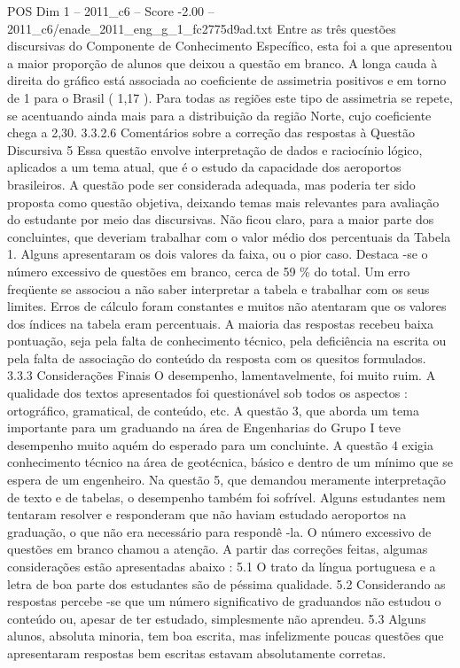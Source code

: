 \begin{textsample}{POS Dim 1 – 2011\_c6 – Score -2.00 – 2011\_c6/enade\_2011\_eng\_g\_1\_fc2775d9ad.txt}
Entre as três questões discursivas do Componente de Conhecimento Específico, esta foi a que apresentou a maior proporção de alunos que deixou a questão em branco.
A longa cauda à direita do gráfico está associada ao coeficiente de assimetria positivos e em torno de 1 para o Brasil ( 1,17 ).
Para todas as regiões este tipo de assimetria se repete, se acentuando ainda mais para a distribuição da região Norte, cujo coeficiente chega a 2,30. 3.3.2.6 Comentários sobre a correção das respostas à Questão Discursiva 5 Essa questão envolve interpretação de dados e raciocínio lógico, aplicados a um tema atual, que é o estudo da capacidade dos aeroportos brasileiros.
A questão pode ser considerada adequada, mas poderia ter sido proposta como questão objetiva, deixando temas mais relevantes para avaliação do estudante por meio das discursivas.
Não ficou claro, para a maior parte dos concluintes, que deveriam trabalhar com o valor médio dos percentuais da Tabela 1.
Alguns apresentaram os dois valores da faixa, ou o pior caso.
Destaca -se o número excessivo de questões em branco, cerca de 59 \% do total.
Um erro freqüente se associou a não saber interpretar a tabela e trabalhar com os seus limites.
Erros de cálculo foram constantes e muitos não atentaram que os valores dos índices na tabela eram percentuais.
A maioria das respostas recebeu baixa pontuação, seja pela falta de conhecimento técnico, pela deficiência na escrita ou pela falta de associação do conteúdo da resposta com os quesitos formulados. 3.3.3 Considerações Finais O desempenho, lamentavelmente, foi muito ruim.
A qualidade dos textos apresentados foi questionável sob todos os aspectos : ortográfico, gramatical, de conteúdo, etc.
A questão 3, que aborda um tema importante para um graduando na área de Engenharias do Grupo I teve desempenho muito aquém do esperado para um concluinte.
A questão 4 exigia conhecimento técnico na área de geotécnica, básico e dentro de um mínimo que se espera de um engenheiro.
Na questão 5, que demandou meramente interpretação de texto e de tabelas, o desempenho também foi sofrível.
Alguns estudantes nem tentaram resolver e responderam que não haviam estudado aeroportos na graduação, o que não era necessário para respondê -la.
O número excessivo de questões em branco chamou a atenção.
A partir das correções feitas, algumas considerações estão apresentadas abaixo : 5.1 O trato da língua portuguesa e a letra de boa parte dos estudantes são de péssima qualidade. 5.2 Considerando as respostas percebe -se que um número significativo de graduandos não estudou o conteúdo ou, apesar de ter estudado, simplesmente não aprendeu. 5.3 Alguns alunos, absoluta minoria, tem boa escrita, mas infelizmente poucas questões que apresentaram respostas bem escritas estavam absolutamente corretas.

\end{textsample}
